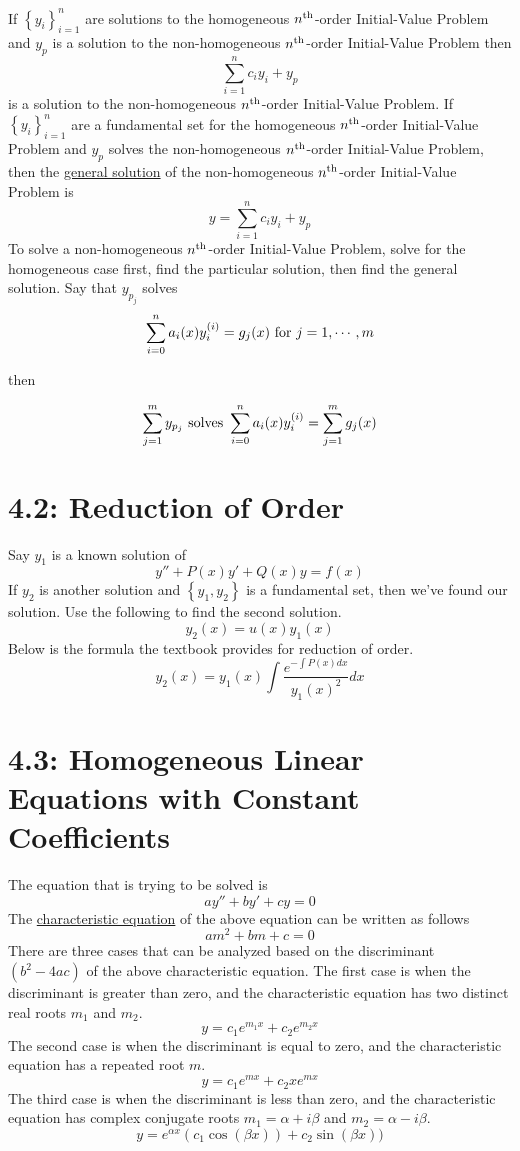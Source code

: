 \documentclass{article}
\begin{document}
If \(\left\{y_i\right\}_{i=1}^n\) are solutions to the homogeneous \(n^{\textnormal{th}}\)-order Initial-Value Problem and \(y_p\) is a solution to the non-homogeneous \(n^{\textnormal{th}}\)-order Initial-Value Problem then
\[\sum_{i=1}^nc_iy_i+y_p\]
is a solution to the non-homogeneous \(n^{\textnormal{th}}\)-order Initial-Value Problem. If \(\left\{y_i\right\}_{i=1}^n\) are a fundamental set for the homogeneous \(n^{\textnormal{th}}\)-order Initial-Value Problem and \(y_p\) solves the non-homogeneous \(n^{\textnormal{th}}\)-order Initial-Value Problem, then the \underline{general solution} of the non-homogeneous \(n^{\textnormal{th}}\)-order Initial-Value Problem is
\[y=\sum_{i=1}^nc_iy_i+y_p\]
To solve a non-homogeneous \(n^{\textnormal{th}}\)-order Initial-Value Problem, solve for the homogeneous case first, find the particular solution, then find the general solution. Say that \(y_{p_j}\) solves
\[\sum_{i=0}^na_i(x)y_i^{(i)}=g_j(x)\textnormal{ for }j=1,\cdots,m\]
\begin{center}then\end{center}
\[\sum_{j=1}^my_{p_j}\textnormal{ solves }\sum_{i=0}^na_i(x)y_i^{(i)}=\sum_{j=1}^mg_j(x)\]
\section*{4.2: Reduction of Order}
Say \(y_1\) is a known solution of
\[y''+P(x)y'+Q(x)y=f(x)\]
If \(y_2\) is another solution and \(\left\{y_1,y_2\right\}\) is a fundamental set, then we've found our solution. Use the following to find the second solution.
\[y_2(x)=u(x)y_1(x)\]
Below is the formula the textbook provides for reduction of order.
\[y_2(x)=y_1(x)\int\frac{e^{-\int P(x)dx}}{y_1(x)^2}dx\]
\section*{4.3: Homogeneous Linear Equations with Constant Coefficients}
The equation that is trying to be solved is
\[ay''+by'+cy=0\]
The \underline{characteristic equation} of the above equation can be written as follows
\[am^2+bm+c=0\]
There are three cases that can be analyzed based on the discriminant \((b^2-4ac)\) of the above characteristic equation. The first case is when the discriminant is greater than zero, and the characteristic equation has two distinct real roots \(m_1\) and \(m_2\).
\[y=c_1e^{m_1x}+c_2e^{m_2x}\]
The second case is when the discriminant is equal to zero, and the characteristic equation has a repeated root \(m\).
\[y=c_1e^{mx}+c_2xe^{mx}\]
The third case is when the discriminant is less than zero, and the characteristic equation has complex conjugate roots \(m_1=\alpha+i\beta\) and \(m_2=\alpha-i\beta\).
\[y=e^{\alpha x}(c_1\cos(\beta x))+c_2\sin(\beta x))\]
\end{document}
